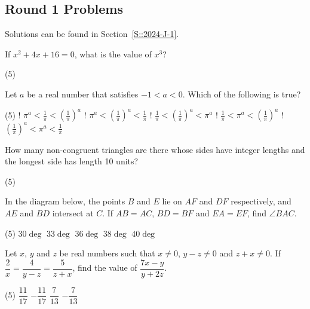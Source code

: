 \subsection{Round 1 Problems}

Solutions can be found in Section~\ref{S::2024-J-1}.

\mcq

\begin{enumerate}
    \hyperrefitem[Q::2024-J-1-1] If $x^2 + 4x + 16 = 0$, what is the value of $x^3$?
    \begin{tasks}(5)
    \end{tasks}
    \hyperrefitem[Q::2024-J-1-2] Let $a$ be a real number that satisfies $-1 < a < 0$. Which of the following is true?
    \begin{tasks}(5)
        \task! $\pi^a < \frac1\pi < (\frac1\pi)^a$
        \task! $\pi^a < (\frac1\pi)^a < \frac1\pi$
        \task! $\frac1\pi < (\frac1\pi)^a < \pi^a$
        \task! $\frac1\pi < \pi^a < (\frac1\pi)^a$
        \task! $(\frac1\pi)^a < \pi^a < \frac1\pi$
    \end{tasks}
    \hyperrefitem[Q::2024-J-1-3] How many non-congruent triangles are there whose sides have integer lengths and the longest side has length 10 units?
    \begin{tasks}(5)
    \end{tasks}
    \hyperrefitem[Q::2024-J-1-4] In the diagram below, the points $B$ and $E$ lie on $AF$ and $DF$ respectively, and $AE$ and $BD$ intersect at $C$. If $AB = AC$, $BD = BF$ and $EA = EF$, find $\angle BAC$.
    \begin{center}
    \end{center}
    \begin{tasks}(5)
        \task $30\deg$
        \task $33\deg$
        \task $36\deg$
        \task $38\deg$
        \task $40\deg$
    \end{tasks}
    \hyperrefitem[Q::2024-J-1-5] Let $x$, $y$ and $z$ be real numbers such that $x \neq 0$, $y - z \neq 0$ and $z + x \neq 0$. If $\dfrac{2}{x} = \dfrac{4}{y - z} = \dfrac{5}{z + x}$, find the value of $\dfrac{7x-y}{y+2z}$.
    \begin{tasks}(5)
        \task $\dfrac{11}{17}$
        \task $-\dfrac{11}{17}$
        \task $\dfrac{7}{13}$
        \task $-\dfrac{7}{13}$
    \end{tasks}
\end{enumerate}

